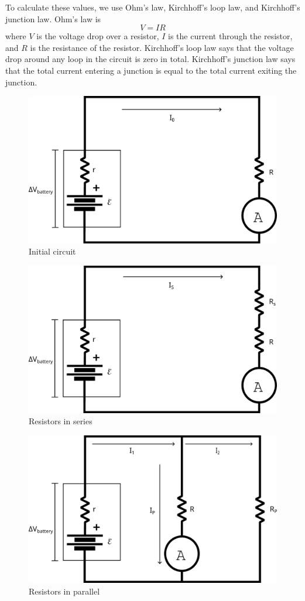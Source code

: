 \documentclass[12pt]{article}
\begin{document}
        To calculate these values, we use Ohm's law, Kirchhoff's loop law, and Kirchhoff's junction law. Ohm's law is 
        \begin{equation*}
            V=IR
        \end{equation*}
        where \(V\) is the voltage drop over a resistor, \(I\) is the current through the resistor, and \(R\) is the resistance of the resistor. Kirchhoff's loop law says that the voltage drop around any loop in the circuit is zero in total. Kirchhoff's junction law says that the total current entering a junction is equal to the total current exiting the junction.
        \begin{figure}[H]
            \centering
            \includegraphics[width=0.75\linewidth]{fig1.png}
            \caption{Initial circuit}
        \end{figure}
        \begin{figure}[H]
            \centering
            \includegraphics[width=0.75\linewidth]{fig2.png}
            \caption{Resistors in series}
        \end{figure}
        \begin{figure}[H]
            \centering
            \includegraphics[width=0.75\linewidth]{fig3.png}
            \caption{Resistors in parallel}
        \end{figure}
\end{document}
